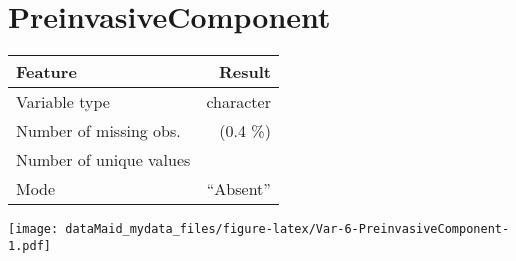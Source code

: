 \documentclass[]{report}
\begin{document}
\noindent\makebox[\linewidth]{\rule{\textwidth}{0.4pt}}

\hypertarget{preinvasivecomponent}{%
\section{PreinvasiveComponent}\label{preinvasivecomponent}}

\begin{minipage}{0.75 \textwidth}

\begin{longtable}[]{@{}lr@{}}
\toprule
\begin{minipage}[b]{0.34\columnwidth}\raggedright
Feature\strut
\end{minipage} & \begin{minipage}[b]{0.16\columnwidth}\raggedleft
Result\strut
\end{minipage}\tabularnewline
\midrule
\endhead
\begin{minipage}[t]{0.34\columnwidth}\raggedright
Variable type\strut
\end{minipage} & \begin{minipage}[t]{0.16\columnwidth}\raggedleft
character\strut
\end{minipage}\tabularnewline
\begin{minipage}[t]{0.34\columnwidth}\raggedright
Number of missing obs.\strut
\end{minipage} & \begin{minipage}[t]{0.16\columnwidth}\raggedleft
1 (0.4 \%)\strut
\end{minipage}\tabularnewline
\begin{minipage}[t]{0.34\columnwidth}\raggedright
Number of unique values\strut
\end{minipage} & \begin{minipage}[t]{0.16\columnwidth}\raggedleft
2\strut
\end{minipage}\tabularnewline
\begin{minipage}[t]{0.34\columnwidth}\raggedright
Mode\strut
\end{minipage} & \begin{minipage}[t]{0.16\columnwidth}\raggedleft
``Absent''\strut
\end{minipage}\tabularnewline
\bottomrule
\end{longtable}

\end{minipage}
\begin{minipage}{0.25 \textwidth}

\texttt{[image: dataMaid\_mydata\_files/figure-latex/Var-6-PreinvasiveComponent-1.pdf]}

\end{minipage}
\end{document}
